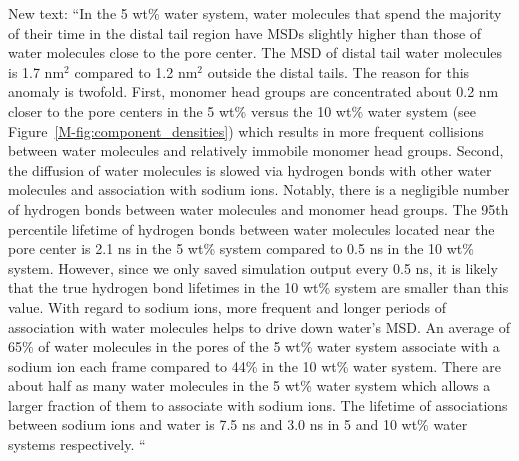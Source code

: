 \documentclass{article}
\begin{document}
\begin{enumerate}
    New text: ``In the 5 wt\% water system, water molecules that spend the majority of their 
	time in the distal tail region have MSDs slightly higher than those of water molecules
	close to the pore center. The MSD of distal tail water molecules is 1.7 nm$^2$
	compared to 1.2 nm$^2$ outside the distal tails. The reason for this anomaly is twofold. 
	First, monomer head groups are concentrated about 0.2 nm closer to the pore centers
	in the 5 wt\% versus the 10 wt\% water system (see Figure~\ref{M-fig:component_densities})  %
        which results in more frequent collisions between water molecules and relatively immobile 
	monomer head groups. 
        Second, the diffusion of water molecules is slowed via hydrogen
	bonds with other water molecules and association with sodium ions. Notably, there is a 
	negligible number of hydrogen bonds between water molecules and monomer head groups.
    The 95th percentile lifetime of hydrogen bonds between water molecules located near the
	pore center is 2.1 ns in the 5 wt\% system compared to 0.5 ns in the 10 wt\% system. 
	However, since we only saved simulation output every 0.5 ns, it is likely that the 
	true hydrogen bond lifetimes in the 10 wt\% system are smaller than this value. 
	With regard to sodium ions, more frequent and longer periods of association
	with water molecules helps to drive down water's MSD. An average of 65\% of water 
	molecules in the pores of the 5 wt\% water system associate with a sodium ion each
	frame compared to 44\% in the 10 wt\% water system. There are about half as many water
	molecules in the 5 wt\% water system which allows a larger fraction of them to associate
	with sodium ions. The lifetime of associations between sodium ions and water is 7.5 ns
	and 3.0 ns in 5 and 10 wt\% water systems respectively.  ``
	

\end{enumerate}
\end{document}
